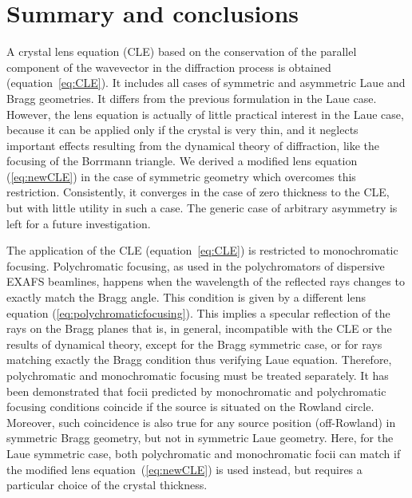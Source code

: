 \documentclass[preprint]{iucr}              %
\newcommand{\inblue}[1]{{\color{black}#1}}
\begin{document}
\section{Summary and conclusions}
\label{sec:summary}
\inblue{A crystal lens equation (CLE) based on the conservation of the parallel component of the wavevector in the diffraction process is obtained (equation~\ref{eq:CLE}). It includes all cases of symmetric and asymmetric Laue and Bragg geometries. It differs from the previous formulation \cite{CK} in the Laue case. However, the lens equation is actually of little practical interest in the Laue case, because it can be applied only if the crystal is very thin, and it neglects important effects resulting from the dynamical theory of diffraction, like the focusing of the Borrmann triangle. We derived a modified lens equation (\ref{eq:newCLE}) in the case of symmetric geometry which overcomes this restriction. Consistently, it converges in the case of zero thickness to the CLE, but with little utility in such a case. The generic case of arbitrary asymmetry is left for a future investigation.

The application of the CLE (equation~\ref{eq:CLE}) is restricted to monochromatic focusing. Polychromatic focusing, as used in the polychromators of dispersive EXAFS beamlines, happens when the wavelength of the reflected rays changes to exactly match the Bragg angle. This condition is given by a different lens equation (\ref{eq:polychromaticfocusing}). This implies a specular reflection of the rays on the Bragg planes that is, in general, incompatible with the CLE or the results of dynamical theory, except for the Bragg symmetric case, or for rays matching exactly the Bragg condition thus verifying Laue equation. Therefore, polychromatic and monochromatic focusing must be treated separately. It has been demonstrated that focii predicted by monochromatic and polychromatic focusing conditions coincide if the source is situated on the Rowland circle. Moreover, such coincidence is also true for any source position (off-Rowland) in symmetric Bragg geometry, but not in symmetric Laue geometry. Here, for the Laue symmetric case, both polychromatic and monochromatic focii can match if the modified lens equation~(\ref{eq:newCLE}) is used instead, but requires a particular choice of the crystal thickness.

}
\end{document}
